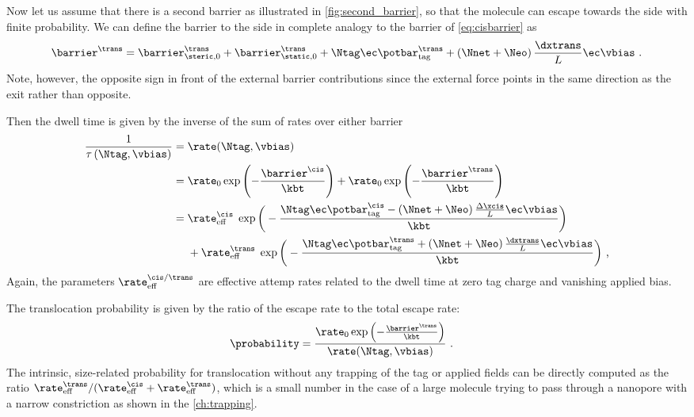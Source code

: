 Now let us assume that there is a second barrier as illustrated in \cref{fig:second_barrier}, so that the
molecule can escape towards the \transi{} side with finite probability. We can define the barrier to the
\transi{} side in complete analogy to the \cisi{} barrier of \cref{eq:cisbarrier} as
%
\begin{align*}
    \barrier^\trans = \barrier^{\trans}_{\steric,0}
        + \barrier^{\trans}_{\static,0}
        + \Ntag \ec  \potbar_{\rm{tag}}^\trans
        + \left(\Nnet + \Neo\right) \frac{\dxtrans}{L}\ec \vbias
        \text{ .}
\end{align*}
%
Note, however, the opposite sign in front of the external barrier contributions since the external force
points in the same direction as the \transi{} exit rather than opposite.

Then the dwell time is given by the inverse of the sum of rates over either barrier
%
\begin{align}\label{eq:double_barrier_rate}
\begin{split}
    \frac{1}{\tau\left(\Ntag,\vbias\right)} ={}& \rate (\Ntag,\vbias)\\
    ={}&
     \rate_0\exp\left(-\frac{\barrier^\cis}{\kbt}\right)
     + \rate_0\exp\left(-\frac{\barrier^\trans}{\kbt}\right)\\
    ={}& \rate^{\cis}_{\rm{eff}}\; \exp\bigg(
        -\frac{\Ntag \ec  \potbar_{\rm{tag}}^\cis
        - \left(\Nnet + \Neo\right) \frac{\Delta \xcis}{L}\ec \vbias}{\kbt}
    \bigg)\\
    &+ \rate^{\trans}_{\rm{eff}}\; \exp\bigg(
        -\frac{\Ntag \ec  \potbar_{\rm{tag}}^\trans
        + \left(\Nnet + \Neo\right) \frac{\dxtrans}{L}\ec \vbias}{\kbt}
    \bigg)
    \text{ ,}
\end{split}
\end{align}
%
Again, the parameters $\rate^{\cis/\trans}_{\rm{eff}}$ are effective attemp rates related to the dwell time at
zero tag charge and vanishing applied bias.

The translocation probability is given by the ratio of the \transi{} escape rate to the total escape rate:
%
\begin{align*}
    \probability ={}& \frac{\rate_0\exp\left(-\frac{\barrier^\trans}{\kbt}\right)}{\rate (\Ntag, \vbias)}
    \text{ .}
\end{align*}
%
The intrinsic, size-related probability for translocation without any trapping of the tag or applied fields
can be directly computed as the ratio $\rate^{\trans}_{\rm{eff}}/(\rate^{\cis}_{\rm{eff}} +
\rate^{\trans}_{\rm eff})$, which is a small number in the case of a large molecule trying to pass through a
nanopore with a narrow \transi{} constriction as shown in the \cref{ch:trapping}.


